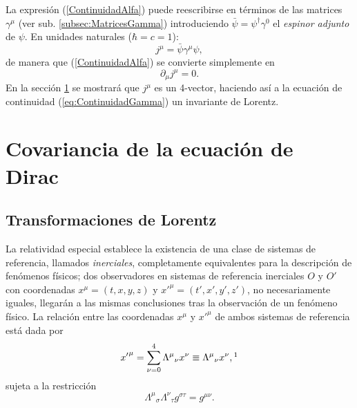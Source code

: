 La expresión (\ref{ContinuidadAlfa}) puede reescribirse en términos de las matrices $\gamma^{\mu}$ (ver sub. \ref{subsec:MatricesGamma}) introduciendo $\bar{\psi}=\psi^{\dagger}\gamma^0$ el \textit{espinor adjunto} de $\psi$. En unidades naturales ($\hbar=c=1$):
\begin{equation}
	j^{\mu}=\bar{\psi}\gamma^{\mu}\psi,
\end{equation}
de manera que (\ref{ContinuidadAlfa}) se convierte simplemente en 
\begin{equation}\label{eq:ContinuidadGamma}
	\partial_{\mu}j^{\mu}=0.
\end{equation}
En la sección \ref{sec:CovED} se mostrará que $j^{\mu}$ es un 4-vector, haciendo así a la ecuación de continuidad (\ref{eq:ContinuidadGamma}) un invariante de Lorentz.


\section{Covariancia de la ecuación de Dirac}
\label{sec:CovED}

\subsection{Transformaciones de Lorentz}
\label{subsec:TransfLorentz}

La relatividad especial establece la existencia de una clase de sistemas de referencia, llamados \textit{inerciales}, completamente equivalentes para la descripción de fenómenos físicos; dos observadores en sistemas de referencia inerciales $O$ y $O'$ con coordenadas $x^{\mu}=(t,x,y,z)$ y ${x'}^{\mu}=(t',x',y',z')$, no necesariamente iguales, llegarán a las mismas conclusiones tras la observación de un fenómeno físico.\footnotemark
{}
La relación entre las coordenadas $x^{\mu}$ y ${x'}^{\mu}$ de ambos sistemas de referencia está dada por
\begin{equation}\label{eq:TransfLorentz}
	{x^\prime}^{\mu}=\sum_{\nu=0}^4 \Lambda^{\mu}{}_{\nu} x^{\nu}\equiv \Lambda^{\mu}{}_{\nu}x^{\nu},\footnotemark
\end{equation}
sujeta a la restricción 
\begin{equation}\label{eq:CondLorentz}
\Lambda^\mu{}_\sigma \Lambda^\nu{}_\tau g^{\sigma \tau}=g^{\mu \nu}.
\end{equation}

